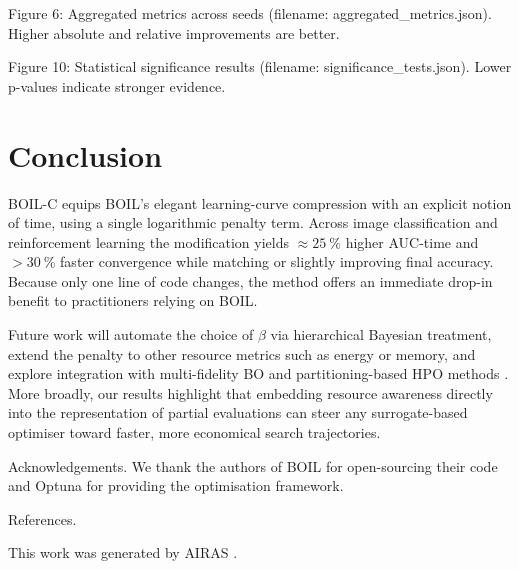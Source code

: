 \documentclass{article} %
\begin{document}
Figure 6: Aggregated metrics across seeds (filename: aggregated\_metrics.json). Higher absolute and relative improvements are better.

Figure 10: Statistical significance results (filename: significance\_tests.json). Lower p-values indicate stronger evidence.

\section{Conclusion}
\label{sec:conclusion}
BOIL-C equips BOIL's elegant learning-curve compression with an explicit notion of time, using a single logarithmic penalty term. Across image classification and reinforcement learning the modification yields \(\approx 25\ \%\) higher AUC-time and \(>30\ \%\) faster convergence while matching or slightly improving final accuracy. Because only one line of code changes, the method offers an immediate drop-in benefit to practitioners relying on BOIL.

Future work will automate the choice of \(\beta\) via hierarchical Bayesian treatment, extend the penalty to other resource metrics such as energy or memory, and explore integration with multi-fidelity BO and partitioning-based HPO methods \cite{mlodozeniec-2023-hyperparameter}. More broadly, our results highlight that embedding resource awareness directly into the representation of partial evaluations can steer any surrogate-based optimiser toward faster, more economical search trajectories.

Acknowledgements. We thank the authors of BOIL for open-sourcing their code and Optuna for providing the optimisation framework.

References. \cite{nguyen-2019-bayesian,mlodozeniec-2023-hyperparameter}

This work was generated by \textsc{AIRAS} \citep{airas2025}.



\end{document}
